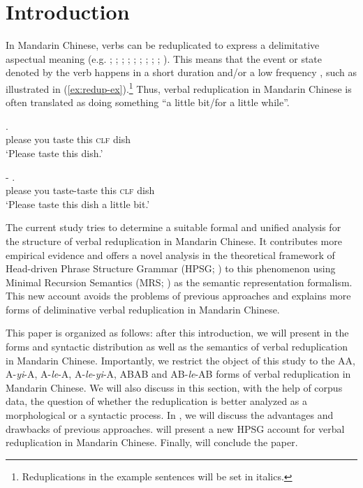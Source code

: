 \section{Introduction}\label{sec:intro}

In Mandarin Chinese, verbs can be reduplicated to express a delimitative aspectual meaning (e.g. \citealt[204--205]{Chao1968}; \citealt[232]{LiThompson1981};  \citealt[14]{Li1996}; \citealt[70]{Dai1997};  \citealt[382--383]{Zhu1998}; \citealt[420--421]{Xing2000}; \citealt[48]{Chen2001};  \citealt[288]{Tsao2001}; \citealt[11--12]{Yang2003}; \citealt[Sec. 4.3]{XiaoMcEnery2004}). 
This means that the event or state denoted by the verb happens in a short duration and/or a low frequency \citep[155]{XiaoMcEnery2004}, such as illustrated in (\ref{ex:redup-ex}).\footnote{Reduplications
    in the example sentences will be set in italics.}
Thus, verbal reduplication in Mandarin Chinese is often translated as doing something ``a little bit/for a little while''.

\ea\label{ex:redup-ex} 
	\ea
	\gll {}     .\\
	please you taste this \textsc{clf} dish\\
	\glt `Please taste this dish.'
	
	\ex
	\gll {}  -   .\\
	please you taste-taste this \textsc{clf} dish\\
	\glt `Please taste this dish a little bit.' 
	\z
\z

The current study tries to determine a suitable formal and unified analysis for the structure of verbal reduplication in Mandarin Chinese.
It contributes more empirical evidence and 
offers a novel analysis in the theoretical framework of Head-driven Phrase Structure Grammar (HPSG; \citealt{PollardSag1994, Sag1997, HPSGHandbook}) to this phenomenon 
using Minimal Recursion Semantics (MRS; \citealt{Copestakeetal2005}) as the semantic representation formalism.
This new account avoids the problems of previous approaches and
explains more forms of deliminative verbal reduplication in Mandarin Chinese.

This paper is organized as follows: 
after this introduction, we will present in  the forms and syntactic distribution as well as the semantics of verbal reduplication in Mandarin Chinese. 
Importantly, we restrict the object of this study to the AA, A-\textit{yi}-A, A-\textit{le}-A, A-\textit{le}-\textit{yi}-A, ABAB and AB-\textit{le}-AB forms of verbal reduplication in Mandarin Chinese.
We will also discuss in this section, with the help of corpus data, the question of whether the reduplication is better analyzed as a morphological or a syntactic process.
In , we will discuss the advantages and drawbacks of previous approaches. 
 will present a new {HPSG} account for verbal reduplication in Mandarin Chinese.
Finally,   will conclude the paper.

